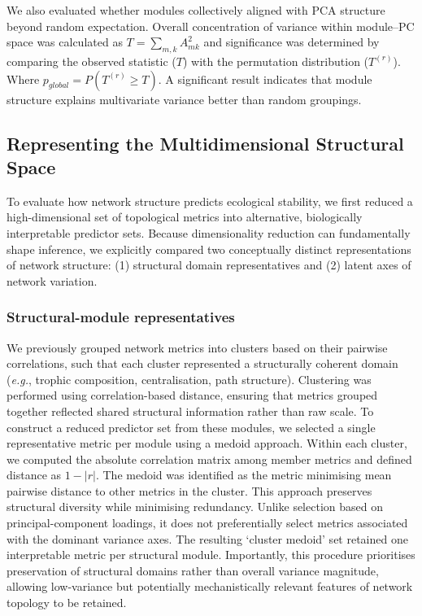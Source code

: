 \documentclass[
]{article}
\begin{document}
We also evaluated whether modules collectively aligned with PCA
structure beyond random expectation. Overall concentration of variance
within module--PC space was calculated as \(T = \sum_{m, k} A^{2}_{mk}\)
and significance was determined by comparing the observed statistic
(\(T\)) with the permutation distribution (\(T^{(r)}\)). Where
\(p_{global} = P(T^{(r)} \geq T)\). A significant result indicates that
module structure explains multivariate variance better than random
groupings.

\subsection{Representing the Multidimensional Structural
Space}\label{representing-the-multidimensional-structural-space}

To evaluate how network structure predicts ecological stability, we
first reduced a high-dimensional set of topological metrics into
alternative, biologically interpretable predictor sets. Because
dimensionality reduction can fundamentally shape inference, we
explicitly compared two conceptually distinct representations of network
structure: (1) structural domain representatives and (2) latent axes of
network variation.

\subsubsection{Structural-module
representatives}\label{structural-module-representatives}

We previously grouped network metrics into clusters based on their
pairwise correlations, such that each cluster represented a structurally
coherent domain (\emph{e.g.}, trophic composition, centralisation, path
structure). Clustering was performed using correlation-based distance,
ensuring that metrics grouped together reflected shared structural
information rather than raw scale. To construct a reduced predictor set
from these modules, we selected a single representative metric per
module using a medoid approach. Within each cluster, we computed the
absolute correlation matrix among member metrics and defined distance as
\(1 − |r|\). The medoid was identified as the metric minimising mean
pairwise distance to other metrics in the cluster. This approach
preserves structural diversity while minimising redundancy. Unlike
selection based on principal-component loadings, it does not
preferentially select metrics associated with the dominant variance
axes. The resulting `cluster medoid' set retained one interpretable
metric per structural module. Importantly, this procedure prioritises
preservation of structural domains rather than overall variance
magnitude, allowing low-variance but potentially mechanistically
relevant features of network topology to be retained.
\end{document}
